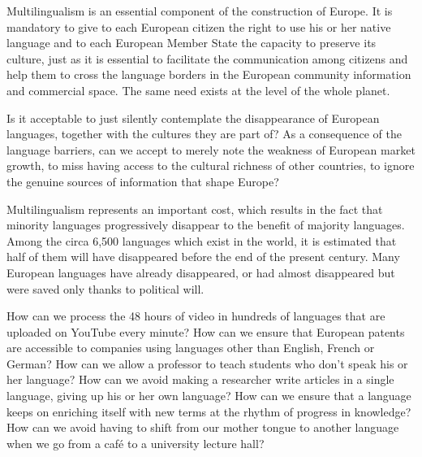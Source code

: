 \begin{multicols}{2}
Multilingualism is an essential component of the construction of Europe. It is mandatory to give to each European citizen the right to use his or her native language and to each European Member State the capacity to preserve its culture, just as it is essential to facilitate the communication among citizens and help them to cross the language borders in the European community information and commercial space. The same need exists at the level of the whole planet.

Is it acceptable to just silently contemplate the disappearance of European languages, together with the cultures they are part of? As a consequence of the language barriers, can we accept to merely note the weakness of European market growth, to miss having access to the cultural richness of other countries, to ignore the genuine sources of information that shape Europe?

Multilingualism represents an important cost, which results in the fact that minority languages progressively disappear to the benefit of majority languages. Among the circa 6,500 languages which exist in the world, it is estimated that half of them will have disappeared before the end of the present century. Many European languages have already disappeared, or had almost disappeared but were saved only thanks to political will.

How can we process the 48 hours of video in hundreds of languages that are uploaded on YouTube every minute? How can we ensure that European patents are accessible to companies using languages other than English, French or German? How can we allow a professor to teach students who don’t speak his or her language? How can we avoid making a researcher write articles in a single language, giving up his or her own language? How can we ensure that a language keeps on enriching itself with new terms at the rhythm of progress in knowledge? How can we avoid having to shift from our mother tongue to another language when we go from a café to a university lecture hall? 


\end{multicols}

